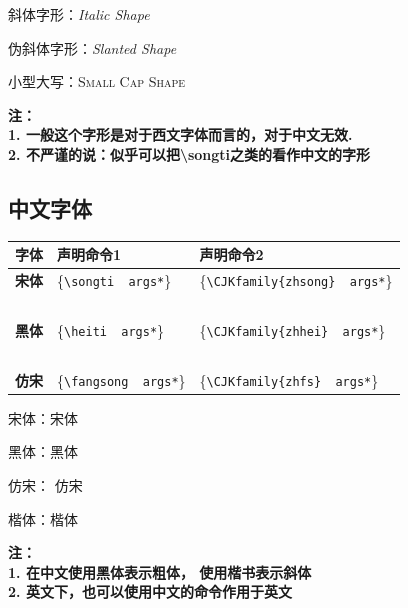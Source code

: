 \documentclass[fontset=windows, 12pt]{article}
\newcommand{\cmd}[2][\{*args\}]{\texttt{\textbackslash#2#1}}
\newcommand{\tb}[1]{\textbf{#1}}
\begin{document}
斜体字形：{\itshape Italic Shape}

伪斜体字形：{\slshape Slanted Shape}

小型大写：{\scshape Small Cap Shape}

\textbf{ 注：\\1. 一般这个字形是对于西文字体而言的，对于中文无效. \\2. 不严谨的说：似乎可以把\textbackslash songti之类的看作中文的字形}
\subsection{中文字体}
\begin{center}
    \begin{tabular}{p{5em}p{12em}p{14em}}
        \toprule
        \textbf{字体} & \textbf{声明命令1} & \textbf{声明命令2}\\
        \hline
        \textbf{宋体} & \ttfamily\{\cmd[~~args*]{songti}\} & \ttfamily\{\cmd[~~args*]{CJKfamily\{zhsong\}}\} \\
        ~\\
        \tb{黑体} & \ttfamily\{\cmd[~~args*]{heiti}\} &  \ttfamily\{\cmd[~~args*]{CJKfamily\{zhhei\}}\} \\
        ~\\
        \tb{仿宋} & \ttfamily\{\cmd[~~args*]{fangsong}\} &  \ttfamily\{\cmd[~~args*]{CJKfamily\{zhfs\}}\} \\
        \bottomrule
    \end{tabular} 
\end{center}

宋体：{\songti 宋体}

黑体：{\heiti  黑体}

仿宋： {\fangsong 仿宋}

楷体：{\kaishu 楷体}

\textbf{注： \\1. 在中文使用黑体表示粗体， 使用楷书表示斜体\\ 2. 英文下，也可以使用中文的命令作用于英文}
\end{document}
